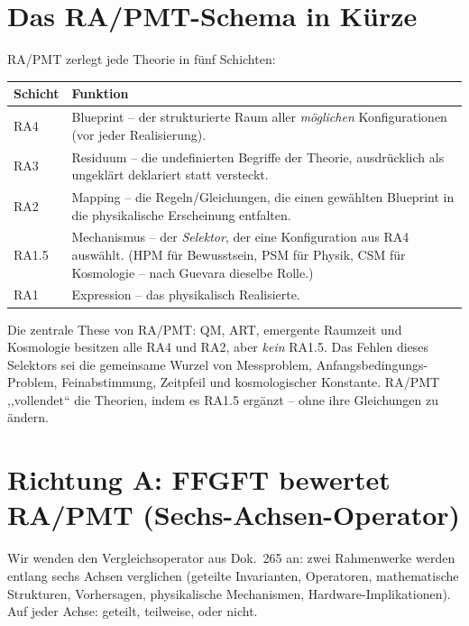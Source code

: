 \section{Das RA/PMT-Schema in Kürze}

RA/PMT zerlegt jede Theorie in fünf Schichten:

\begin{center}
\begin{tabular}{p{2.2cm}p{9.5cm}}
\toprule
\textbf{Schicht} & \textbf{Funktion} \\
\midrule
RA4 & Blueprint -- der strukturierte Raum aller \emph{möglichen}
      Konfigurationen (vor jeder Realisierung). \\
\addlinespace
RA3 & Residuum -- die undefinierten Begriffe der Theorie, ausdrücklich
      als ungeklärt deklariert statt versteckt. \\
\addlinespace
RA2 & Mapping -- die Regeln/Gleichungen, die einen gewählten Blueprint
      in die physikalische Erscheinung entfalten. \\
\addlinespace
RA1.5 & Mechanismus -- der \emph{Selektor}, der eine Konfiguration aus
      RA4 auswählt. (HPM für Bewusstsein, PSM für Physik, CSM für
      Kosmologie -- nach Guevara dieselbe Rolle.) \\
\addlinespace
RA1 & Expression -- das physikalisch Realisierte. \\
\bottomrule
\end{tabular}
\end{center}

Die zentrale These von RA/PMT: QM, ART, emergente Raumzeit und
Kosmologie besitzen alle RA4 und RA2, aber \emph{kein} RA1.5. Das
Fehlen dieses Selektors sei die gemeinsame Wurzel von Messproblem,
Anfangsbedingungs-Problem, Feinabstimmung, Zeitpfeil und kosmologischer
Konstante. RA/PMT ,,vollendet`` die Theorien, indem es RA1.5 ergänzt --
ohne ihre Gleichungen zu ändern.

\section{Richtung A: FFGFT bewertet RA/PMT (Sechs-Achsen-Operator)}

Wir wenden den Vergleichsoperator aus Dok.~265 an: zwei Rahmenwerke
werden entlang sechs Achsen verglichen (geteilte Invarianten, Operatoren,
mathematische Strukturen, Vorhersagen, physikalische Mechanismen,
Hardware-Implikationen). Auf jeder Achse: geteilt, teilweise, oder nicht.

